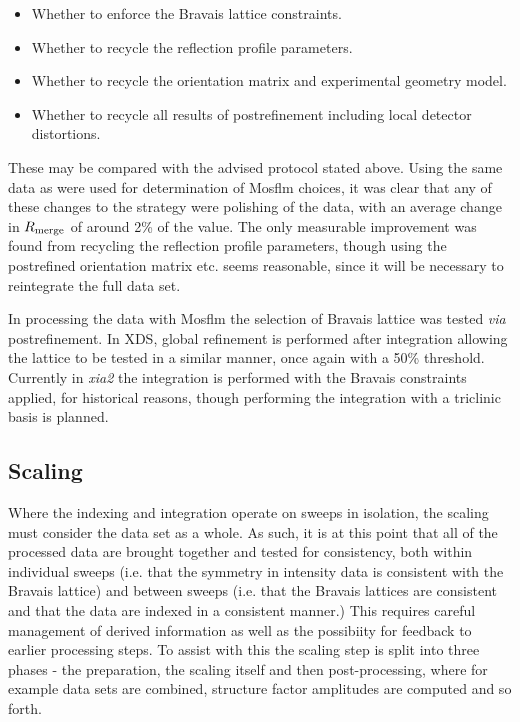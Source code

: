 \documentclass[a4paper,11pt]{article}
\begin{document}
\begin{itemize}
\item{Whether to enforce the Bravais lattice constraints.}
\item{Whether to recycle the reflection profile parameters.}
\item{Whether to recycle the orientation matrix and experimental
    geometry model.}
\item{Whether to recycle all results of postrefinement including local
    detector distortions.}
\end{itemize}

\noindent
These may be compared with the advised protocol stated above. Using
the same data as were used for determination of Mosflm choices, it was
clear that any of these changes to the strategy were polishing of the
data, with an average change in $R_{\rm{merge}}$ of around 2\% of the
value. The only measurable improvement was found from recycling the
reflection profile parameters, though using the postrefined
orientation matrix etc. seems reasonable, since it will be necessary
to reintegrate the full data set.

In processing the data with Mosflm the selection of Bravais lattice
was tested \emph{via} postrefinement. In XDS, global refinement is
performed after integration allowing the lattice to be tested in a
similar manner, once again with a 50\% threshold. Currently in
\emph{xia2} the integration is performed with the Bravais constraints
applied, for historical reasons, though performing the integration
with a triclinic basis is planned. 

\subsection{Scaling}

Where the indexing and integration operate on sweeps in isolation, the
scaling must consider the data set as a whole. As such, it is at this
point that all of the processed data are brought together and tested
for consistency, both within individual sweeps (i.e. that the symmetry
in intensity data is consistent with the Bravais lattice) and between
sweeps (i.e. that the Bravais lattices are consistent and that the
data are indexed in a consistent manner.) This requires careful
management of derived information as well as the possibiity for feedback to
earlier processing steps. To assist with this the scaling step is
split into three phases - the preparation, the scaling itself and then
post-processing, where for example data sets are combined, structure
factor amplitudes are computed and so forth.
\end{document}
